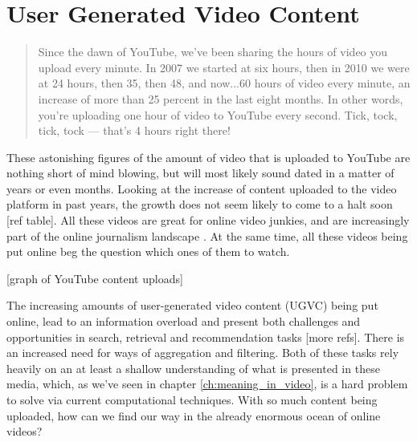 \section{User Generated Video Content}
\label{sec:weporter_ugvc}

 
% 
% 

\begin{quote}
  Since the dawn of YouTube, we’ve been sharing the hours of video you upload every minute. In 2007 we started at six hours, then in 2010 we were at 24 hours, then 35, then 48, and now...60 hours of video every minute, an increase of more than 25 percent in the last eight months. In other words, you’re uploading one hour of video to YouTube every second. Tick, tock, tick, tock — that’s 4 hours right there!
\end{quote}

These astonishing figures of the amount of video that is uploaded to YouTube are nothing short of mind blowing, but will most likely sound dated in a matter of years or even months. Looking at the increase of content uploaded to the video platform in past years, the growth does not seem likely to come to a halt soon [ref table]. All these videos are great for online video junkies, and are increasingly part of the online journalism landscape \cite{Rosenstiel:2012vb}. At the same time, all these videos being put online beg the question which ones of them to watch.

[graph of YouTube content uploads]

The increasing amounts of user-generated video content (UGVC) being put online, lead to an information overload and present both challenges and opportunities in search, retrieval\cite{Ulges:2009ua} and recommendation\cite{Zhou:2010ut} tasks [more refs]. There is an increased need for ways of aggregation and filtering. Both of these tasks rely heavily on an at least a shallow understanding of what is presented in these media, which, as we've seen in chapter \ref{ch:meaning_in_video}, is a hard problem to solve via current computational techniques. With so much content being uploaded, how can we find our way in the already enormous ocean of online videos?


